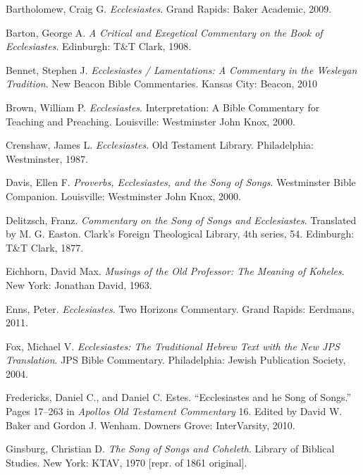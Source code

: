 \documentclass[titlepage]{article}
\begin{document}
\begingroup
\renewcommand{\section}[2]{}%
\begin{thebibliography}{99}
\makeatletter%
\addtocounter{\@listctr}{6}
\makeatother

 Bartholomew, Craig G. \emph{Ecclesiastes}. Grand Rapids: Baker Academic, 2009.

 Barton, George A. \emph{A Critical and Exegetical Commentary on the Book of Ecclesiastes}. Edinburgh: T\&T Clark, 1908.

 Bennet, Stephen J. \emph{Ecclesiastes / Lamentations: A Commentary in the Wesleyan Tradition}. New Beacon Bible Commentaries. Kansas City: Beacon, 2010

 Brown, William P. \emph{Ecclesiastes}. Interpretation: A Bible Commentary for Teaching and Preaching. Louisville: Westminster John Knox, 2000.

 Crenshaw, James L. \emph{Ecclesiastes}. Old Testament Library. Philadelphia: Westminster, 1987.

 Davis, Ellen F. \emph{Proverbs, Ecclesiastes, and the Song of Songs}. Westminster Bible Companion. Louisville: Westminster John Knox, 2000.

 Delitzsch, Franz. \emph{Commentary on the Song of Songs and Ecclesiastes}. Translated by M. G. Easton. Clark’s Foreign Theological Library, 4th series, 54. Edinburgh: T\&T Clark, 1877.

 Eichhorn, David Max. \emph{Musings of the Old Professor: The Meaning of Koheles}. New York: Jonathan David, 1963.

 Enns, Peter. \emph{Ecclesiastes}. Two Horizons Commentary. Grand Rapids: Eerdmans, 2011.

 Fox, Michael V. \emph{Ecclesiastes: The Traditional Hebrew Text with the New JPS Translation}. JPS Bible Commentary. Philadelphia: Jewish Publication Society, 2004.

 Fredericks, Daniel C., and Daniel C. Estes. “Ecclesiastes and he Song of Songs.” Pages 17–263 in \emph{Apollos Old Testament Commentary} 16. Edited by David W. Baker and Gordon J. Wenham. Downers Grove: InterVarsity, 2010.

 Ginsburg, Christian D. \emph{The Song of Songs and Coheleth}. Library of Biblical Studies. New York: KTAV, 1970 [repr. of 1861 original].


\end{thebibliography}
\end{document}

